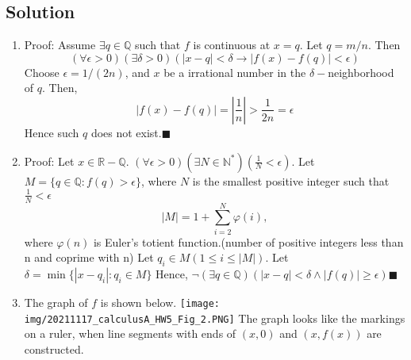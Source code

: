 \documentclass{article}
\begin{document}
\subsection*{Solution}
\begin{enumerate} [label=\textbf{\alph*.}]
    \item Proof:\newline
    Assume $\exists q\in \mathbb{Q}$ such that $f$ is continuous at $x=q$. Let $q=m/n$. Then 
    \[(\forall \epsilon>0)(\exists \delta>0)(|x-q|<\delta \rightarrow |f(x)-f(q)|<\epsilon)\]
    Choose $\epsilon=1/(2n)$, and $x$ be a irrational number in the $\delta-$neighborhood of $q$. Then,
    \[|f(x)-f(q)|=|\frac{1}{n}|>\frac{1}{2n}=\epsilon\]
    Hence such $q$ does not exist.\newline $\blacksquare$
    \item Proof: \newline
    Let $x\in \mathbb{R}-\mathbb{Q}$. \newline
    $(\forall \epsilon>0)(\exists N\in\mathbb{N}^*)(\frac{1}{N}<\epsilon)$. \newline
    Let $M=\{q\in \mathbb{Q}: f(q)>\epsilon\}$, where $N$ is the smallest positive integer such that $\frac{1}{N}<\epsilon$ 
     \[|M|=1+\sum _{i=2}^N \varphi(i),\] where $\varphi(n)$ is Euler's totient function.(number of positive integers less than n and coprime with n)\newline
    Let $q_i\in M(1\leq i \leq |M|)$.\newline
    Let $\delta=\min \{|x-q_i|:q_i\in M\}$
    Hence, $\lnot (\exists q\in \mathbb{Q})(|x-q|<\delta \land |f(q)|\geq \epsilon)$\newline$\blacksquare$ 
    \item The graph of $f$ is shown below.\newline
    \texttt{[image: img/20211117\_calculusA\_HW5\_Fig\_2.PNG]}\newline
    The graph looks like the markings on a ruler, when line segments with ends of $(x,0)$ and $(x,f(x))$ are constructed.
\end{enumerate}
\end{document}
